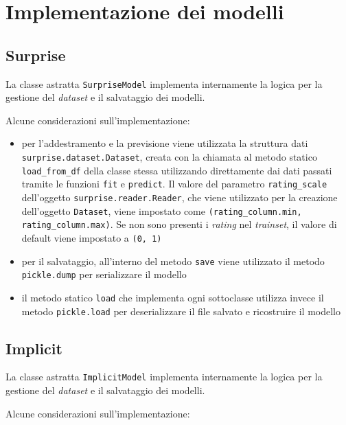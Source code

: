\section{Implementazione dei modelli}

\subsection{Surprise}

La classe astratta \texttt{SurpriseModel} implementa internamente la logica per la gestione del \textit{dataset} e il salvataggio dei modelli. 

Alcune considerazioni sull'implementazione:

\begin{itemize}
    \item per l'addestramento e la previsione viene utilizzata la struttura dati \\ \texttt{surprise.dataset.Dataset}, creata con la chiamata al metodo statico \\ \texttt{load\_from\_df} della classe stessa utilizzando direttamente dai dati passati tramite le funzioni \texttt{fit} e \texttt{predict}. Il valore del parametro \texttt{rating\_scale} dell'oggetto \texttt{surprise.reader.Reader}, che viene utilizzato per la creazione dell'oggetto \texttt{Dataset}, viene impostato come \texttt{(rating\_column.min, \\ rating\_column.max)}. Se non sono presenti i \textit{rating} nel \textit{trainset}, il valore di default viene impostato a \texttt{(0, 1)}
    \item per il salvataggio, all'interno del metodo \texttt{save} viene utilizzato il metodo \texttt{pickle.dump} per serializzare il modello
    \item il metodo statico \texttt{load} che implementa ogni sottoclasse utilizza invece il metodo \texttt{pickle.load} per deserializzare il file salvato e ricostruire il modello
\end{itemize}

\subsection{Implicit}

La classe astratta \texttt{ImplicitModel} implementa internamente la logica per la gestione del \textit{dataset} e il salvataggio dei modelli. 

Alcune considerazioni sull'implementazione:

